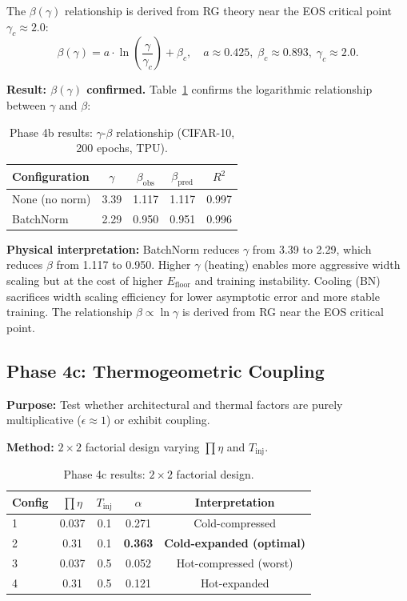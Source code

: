 \documentclass[11pt, a4paper]{article}
\theoremstyle{definition}
\begin{document}
The $\beta(\gamma)$ relationship is derived from RG theory near the EOS critical point $\gamma_c \approx 2.0$:
\begin{equation}
\beta(\gamma) = a \cdot \ln\!\left(\frac{\gamma}{\gamma_c}\right) + \beta_c,
\quad a \approx 0.425,\; \beta_c \approx 0.893,\; \gamma_c \approx 2.0.
\end{equation}

\textbf{Result: $\beta(\gamma)$ confirmed.} Table~\ref{tab:phase4b_results} confirms the logarithmic relationship between $\gamma$ and $\beta$:

\begin{table}[htbp]
\centering
\caption{Phase 4b results: $\gamma$-$\beta$ relationship (CIFAR-10, 200 epochs, TPU).}
\label{tab:phase4b_results}
\begin{tabular}{@{}lcccc@{}}
\toprule
\textbf{Configuration} & $\gamma$ & $\beta_{\text{obs}}$ & $\beta_{\text{pred}}$ & $R^2$ \\
\midrule
None (no norm) & 3.39 & 1.117 & 1.117 & 0.997 \\
BatchNorm & 2.29 & 0.950 & 0.951 & 0.996 \\
\bottomrule
\end{tabular}
\end{table}

\textbf{Physical interpretation:} BatchNorm reduces $\gamma$ from 3.39 to 2.29, which reduces $\beta$ from 1.117 to 0.950. Higher $\gamma$ (heating) enables more aggressive width scaling but at the cost of higher $E_{\mathrm{floor}}$ and training instability. Cooling (BN) sacrifices width scaling efficiency for lower asymptotic error and more stable training. The relationship $\beta \propto \ln\gamma$ is derived from RG near the EOS critical point.

\subsection{Phase 4c: Thermogeometric Coupling}
\label{sec:phase4c}

\textbf{Purpose:} Test whether architectural and thermal factors are purely multiplicative ($\epsilon \approx 1$) or exhibit coupling.

\textbf{Method:} $2 \times 2$ factorial design varying $\prod\eta$ and $T_{\text{inj}}$.

\begin{table}[htbp]
\centering
\caption{Phase 4c results: $2\times2$ factorial design.}
\label{tab:phase4c_results}
\begin{tabular}{@{}lcccc@{}}
\toprule
\textbf{Config} & $\prod\eta$ & $T_{\text{inj}}$ & $\alpha$ & \textbf{Interpretation} \\
\midrule
1 & 0.037 & 0.1 & 0.271 & Cold-compressed \\
2 & 0.31 & 0.1 & \textbf{0.363} & \textbf{Cold-expanded (optimal)} \\
3 & 0.037 & 0.5 & 0.052 & Hot-compressed (worst) \\
4 & 0.31 & 0.5 & 0.121 & Hot-expanded \\
\bottomrule
\end{tabular}
\end{table}
\end{document}
